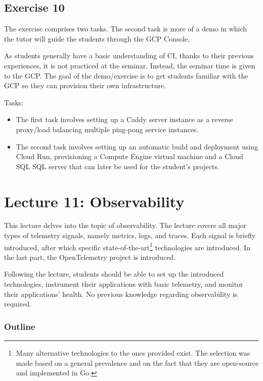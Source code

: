 \documentclass[
  digital,
  color,
  oneside,
  nosansbold,
  nocolorbold,
  lof,
  lot,
]{fithesis4}
\begin{document}
\subsection{Exercise 10}

The exercise comprises two tasks. The second task is more of a demo in which the tutor will guide the students through the GCP Console.

As students generally have a basic understanding of CI, thanks to their previous experiences, it is not practiced at the seminar. Instead, the seminar time is given to the GCP. The goal of the demo/exercise is to get students familiar with the GCP so they can provision their own infrastructure.

Tasks:
\begin{itemize}
    \item The first task involves setting up a Caddy server instance as a reverse proxy/load balancing multiple ping-pong service instances.
    \item The second task involves setting up an automatic build and deployment using Cloud Run, provisioning a Compute Engine virtual machine and a Cloud SQL SQL server that can later be used for the student's projects.
\end{itemize}
    
\section{Lecture 11: Observability}\label{lecture-observability}

This lecture delves into the topic of observability. The lecture covers all major types of telemetry signals, namely metrics, logs, and traces. Each signal is briefly introduced, after which specific state-of-the-art\footnote{Many alternative technologies to the ones provided exist. The selection was made based on a general prevalence and on the fact that they are open-source and implemented in Go.}
technologies are introduced. In the last part, the OpenTelemetry project is introduced.

Following the lecture, students should be able to set up the introduced technologies, instrument their applications with basic telemetry, and monitor their applications' health. No previous knowledge regarding observability is required.

\subsubsection{Outline}
\end{document}
